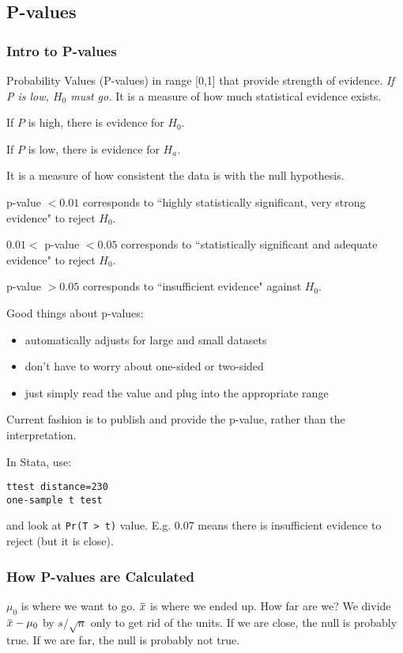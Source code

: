 \documentclass[11pt, oneside]{article}   	%
\newcommand{\overbar}[1]{\mkern 1.5mu\overline{\mkern-1.5mu#1\mkern-1.5mu}\mkern 1.5mu}
\begin{document}
\subsection{P-values}
\subsubsection{Intro to P-values}

Probability Values (P-values) in range [0,1] that provide strength of evidence. \textit{If P is low, $H_0$ must go.} It is a measure of how much statistical evidence exists. 

If $P$ is high, there is evidence for $H_0$.

If $P$ is low, there is evidence for $H_a$.

It is a measure of how consistent the data is with the null hypothesis. 

p-value $< 0.01$ corresponds to ``highly statistically significant, very strong evidence" to reject $H_0$.

$0.01 <$ p-value $< 0.05$ corresponds to ``statistically significant and adequate evidence" to reject $H_0$.

p-value $> 0.05$ corresponds to ``insufficient evidence" against $H_0$.

Good things about p-values:
\begin{itemize}
\item{automatically adjusts for large and small datasets}
\item{don't have to worry about one-sided or two-sided}
\item{just simply read the value and plug into the appropriate range}
\end{itemize}

Current fashion is to publish and provide the p-value, rather than the interpretation.

In Stata, use:
\begin{verbatim}
ttest distance=230
one-sample t test
\end{verbatim}
and look at \texttt{Pr(T > t)} value. E.g. 0.07 means there is insufficient evidence to reject (but it is close).

\subsubsection{How P-values are Calculated}

$\mu_0$ is where we want to go. $\overbar{x}$ is where we ended up. How far are we? We divide $\overbar{x} - \mu_0$ by $s / \sqrt{n}$ only to get rid of the units. If we are close, the null is probably true. If we are far, the null is probably not true.
\end{document}
